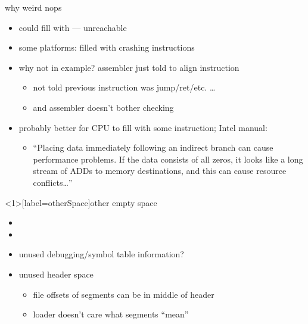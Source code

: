 \begin{frame}{why weird nops}
    \begin{itemize}
    \item could fill with  --- unreachable
    \item some platforms: filled with crashing instructions
    \vspace{.5cm}
    \item why not in example? assembler just told to align instruction
        \begin{itemize}
        \item not told previous instruction was jump/ret/etc. \ldots
        \item and assembler doesn't bother checking
        \end{itemize}
    \item probably better for CPU to fill with some instruction; Intel manual:
        \begin{itemize}
        \item ``Placing data immediately following an indirect branch
              can cause performance problems. If the data consists of all zeros,
              it looks like a long stream of ADDs to memory destinations, and this can cause
              resource conflicts\ldots''
        \end{itemize}
    \end{itemize}
\end{frame}

\begin{frame}<1>[label=otherSpace]{other empty space}
\begin{itemize}
\item {}
\item {}
\item unused debugging/symbol table information?
\item unused header space 
    \begin{itemize}
    \item file offsets of segments can be in middle of header
    \item loader doesn't care what segments ``mean''
    \end{itemize}
\end{itemize}
\end{frame}


